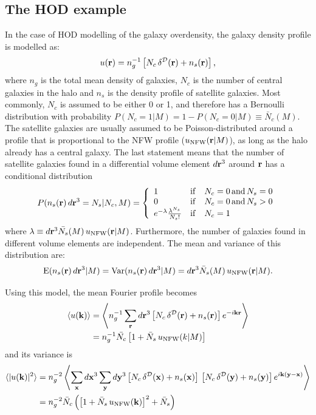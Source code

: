 \documentclass{article}
\begin{document}
  \subsection{The HOD example}
    In the case of HOD modelling of the galaxy overdensity, the galaxy density profile is modelled as:
    \begin{equation}
      u({\bf r})=n_g^{-1}\left[N_c\,\delta^{\cal D}({\bf r})+n_s({\bf r})\right],
    \end{equation}
    where $n_g$ is the total mean density of galaxies, $N_c$ is the number of central galaxies in the halo and $n_s$ is the density profile of satellite galaxies. Most commonly, $N_c$ is assumed to be either 0 or 1, and therefore has a Bernoulli distribution with probability $P(N_c=1|M)=1-P(N_c=0|M)\equiv \bar{N}_c(M)$. The satellite galaxies are usually assumed to be Poisson-distributed around a profile that is proportional to the NFW profile ($u_{\rm NFW}({\bf r}|M)$), as long as the halo already has a central galaxy. The last statement means that the number of satellite galaxies found in a differential volume element $d{\bf r}^3$ around ${\bf r}$ has a conditional distribution
    \begin{equation}
      P(n_s({\bf r})\,d{\bf r}^3=N_s|N_c,M)=
      \left\{\begin{array}{lll}
          1 & {\rm if} & N_c=0\,{\rm and}\,N_s=0\\
          0 & {\rm if} & N_c=0\,{\rm and}\,N_s>0\\
          e^{-\lambda}\frac{\lambda^{N_s}}{N_s!} & {\rm if} & N_c=1
      \end{array}\right.
    \end{equation}
    where $\lambda\equiv d{\bf r}^3\bar{N_s}(M)\,u_{\rm NFW}({\bf r}|M)$. Furthermore, the number of galaxies found in different volume elements are independent. The mean and variance of this distribution are:
    \begin{equation}
      {\rm E}(n_s({\bf r})\,d{\bf r}^3|M)={\rm Var}(n_s({\bf r})\,d{\bf r}^3|M)=d{\bf r}^3 \bar{N}_s(M)\,u_{\rm NFW}({\bf r}|M).
    \end{equation}

    Using this model, the mean Fourier profile becomes
    \begin{align}
      \langle u({\bf k})\rangle
      &=\left\langle n_g^{-1}\sum_{\bf r} d{\bf r}^3 \left[N_c\,\delta^{\cal D}({\bf r})+n_s({\bf r})\right]e^{-i{\bf k}{\bf r}}\right\rangle\\
      &=n_g^{-1}\bar{N_c}\left[1+\bar{N}_s\,u_{\rm NFW}(k|M)\right]\\
    \end{align}
    and its variance is
    \begin{align}
      \langle |u({\bf k})|^2\rangle
      &=n_g^{-2}\left\langle \sum_{\bf x} d{\bf x}^3\sum_{\bf y} d{\bf y}^3 \left[N_c\,\delta^{\cal D}({\bf x})+n_s({\bf x})\right]\,\left[N_c\,\delta^{\cal D}({\bf y})+n_s({\bf y})\right]e^{i{\bf k}({\bf y}-{\bf x})}\right\rangle\\ 
      &=n_g^{-2}\bar{N}_c\left(\left[1+\bar{N}_s\,u_{\rm NFW}({\bf k})\right]^2+\bar{N}_s\right)
    \end{align}
\end{document}
